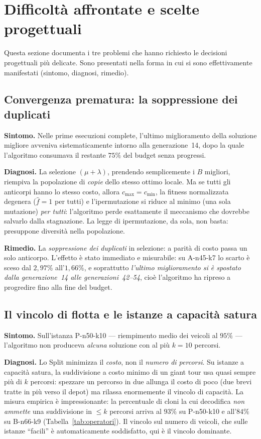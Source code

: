 \documentclass[10pt,a4paper]{article}
\begin{document}
\section{Difficoltà affrontate e scelte progettuali}
\label{sec:difficolta}

Questa sezione documenta i tre problemi che hanno richiesto le decisioni
progettuali più delicate. Sono presentati nella forma in cui si sono
effettivamente manifestati (sintomo, diagnosi, rimedio).

\subsection{Convergenza prematura: la soppressione dei duplicati}

\textbf{Sintomo.} Nelle prime esecuzioni complete, l'ultimo miglioramento della
soluzione migliore avveniva sistematicamente intorno alla generazione~14, dopo la
quale l'algoritmo consumava il restante $75\%$ del budget senza progressi.

\textbf{Diagnosi.} La selezione $(\mu+\lambda)$, prendendo semplicemente i $B$
migliori, riempiva la popolazione di \emph{copie} dello stesso ottimo locale.
Ma se tutti gli anticorpi hanno lo stesso costo, allora $c_{\max}=c_{\min}$, la
fitness normalizzata degenera ($\hat{f}=1$ per tutti) e l'ipermutazione si
riduce al minimo (una sola mutazione) \emph{per tutti}: l'algoritmo perde
esattamente il meccanismo che dovrebbe salvarlo dalla stagnazione. La legge di
ipermutazione, da sola, non basta: presuppone diversità nella popolazione.

\textbf{Rimedio.} La \emph{soppressione dei duplicati} in selezione: a parità di
costo passa un solo anticorpo. L'effetto è stato immediato e misurabile: su
A-n45-k7 lo scarto è sceso dal $2{,}97\%$ all'$1{,}66\%$, e soprattutto
\emph{l'ultimo miglioramento si è spostato dalla generazione~14 alle
generazioni~42--54}, cioè l'algoritmo ha ripreso a progredire fino alla fine del
budget.

\subsection{Il vincolo di flotta e le istanze a capacità satura}

\textbf{Sintomo.} Sull'istanza P-n50-k10 --- riempimento medio dei veicoli al
$95\%$ --- l'algoritmo non produceva \emph{alcuna} soluzione con al più $k=10$
percorsi.

\textbf{Diagnosi.} Lo Split minimizza il \emph{costo}, non il \emph{numero di
percorsi}. Su istanze a capacità satura, la suddivisione a costo minimo di un
giant tour usa quasi sempre più di $k$ percorsi: spezzare un percorso in due
allunga il costo di poco (due brevi tratte in più verso il depot) ma rilassa
enormemente il vincolo di capacità. La misura empirica è impressionante: la
percentuale di cloni la cui decodifica \emph{non ammette} una suddivisione in
$\le k$ percorsi arriva al $93\%$ su P-n50-k10 e all'$84\%$ su B-n66-k9
(Tabella~\ref{tab:operatori}). Il vincolo sul numero di veicoli, che sulle
istanze ``facili'' è automaticamente soddisfatto, qui è il vincolo dominante.
\end{document}
